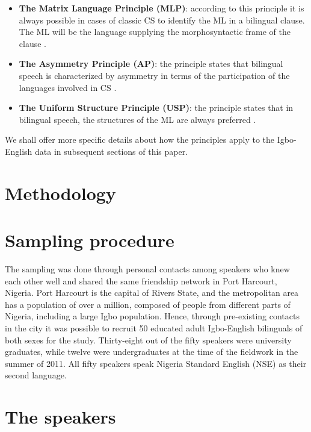 \documentclass[output=paper]{langsci/langscibook}
\begin{document}
\begin{itemize}
 \item \textbf{The Matrix Language Principle (MLP)}: according to this principle it is always possible in cases of classic CS to identify the ML in a bilingual clause. The ML will be the language supplying the morphosyntactic frame of the clause \citep[8]{MyersScotton2002}. 

 \item \textbf{The Asymmetry Principle (AP)}: the principle states that bilingual speech is characterized by asymmetry in terms of the participation of the languages involved in CS \citep[9]{MyersScotton2002}. 

 \item \textbf{The Uniform Structure Principle (USP)}: the principle states that in bilingual speech, the structures of the ML are always preferred \citep[8-9]{MyersScotton2002}.

\end{itemize}
 
We shall offer more specific details about how the principles apply to the Igbo-English data in subsequent sections of this paper.

\section{Methodology}

\section{Sampling procedure}

The sampling was done through personal contacts among speakers who knew each other well and shared the same friendship network in Port Harcourt, Nigeria. Port Harcourt is the capital of Rivers State, and the metropolitan area has a population of over a million, composed of people from different parts of Nigeria, including a large Igbo population. Hence, through pre-existing contacts in the city it was possible to recruit 50 educated adult Igbo-English bilinguals of both sexes for the study. Thirty-eight out of the fifty speakers were university graduates, while twelve were undergraduates at the time of the fieldwork in the summer of 2011. All fifty speakers speak Nigeria Standard English (NSE) as their second language.

\section{The speakers}
\end{document}
